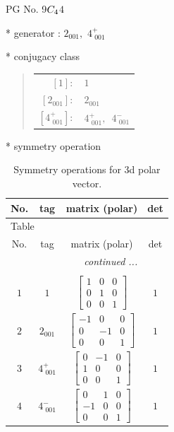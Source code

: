 \documentclass[fleqn,8pt]{jsarticle}
\begin{document}
\setcounter{MaxMatrixCols}{32}

\renewcommand{\tablename}{Table~}
\renewcommand{\figurename}{Figure~}
\begin{center}
\LARGE
PG No. 9\quad$C_{\rm 4}$\quad$4$\quad[ tetragonal ]
\end{center}

* generator : $2{}_{001},\,\,4^{+}_{\,\,001}$

* conjugacy class
\begin{quote}
\begin{tabular}{rl}
$ [1]: $ & $ 1 $ \\
$ [2{}_{001}]: $ & $ 2{}_{001} $ \\
$ [4^{+}_{\,\,001}]: $ & $ 4^{+}_{\,\,001},\,\,\,4^{-}_{\,\,001} $
\end{tabular}
\end{quote}

* symmetry operation
\renewcommand{\arraystretch}{1.3}
\begin{longtable}{cccc}
\caption{Symmetry operations for 3d polar vector.}
 \\
 \hline \hline
No. & tag & matrix (polar) & det \\ \hline \endfirsthead

\multicolumn{3}{l}{\tablename\ \thetable{}} \\
 \hline \hline
No. & tag & matrix (polar) & det \\ \hline \endhead

 \hline \hline
\multicolumn{3}{r}{\footnotesize\it continued ...} \\ \endfoot

 \hline \hline
\multicolumn{3}{r}{} \\ \endlastfoot

$ 1 $ & $ 1 $ & $ \begin{bmatrix} 1 & 0 & 0 \\ 0 & 1 & 0 \\ 0 & 0 & 1 \end{bmatrix} $ & $ 1 $ \\ \hline
$ 2 $ & $ 2{}_{001} $ & $ \begin{bmatrix} -1 & 0 & 0 \\ 0 & -1 & 0 \\ 0 & 0 & 1 \end{bmatrix} $ & $ 1 $ \\ \hline
$ 3 $ & $ 4^{+}_{\,\,001} $ & $ \begin{bmatrix} 0 & -1 & 0 \\ 1 & 0 & 0 \\ 0 & 0 & 1 \end{bmatrix} $ & $ 1 $ \\ \hline
$ 4 $ & $ 4^{-}_{\,\,001} $ & $ \begin{bmatrix} 0 & 1 & 0 \\ -1 & 0 & 0 \\ 0 & 0 & 1 \end{bmatrix} $ & $ 1 $ \\
\end{longtable}
\end{document}
